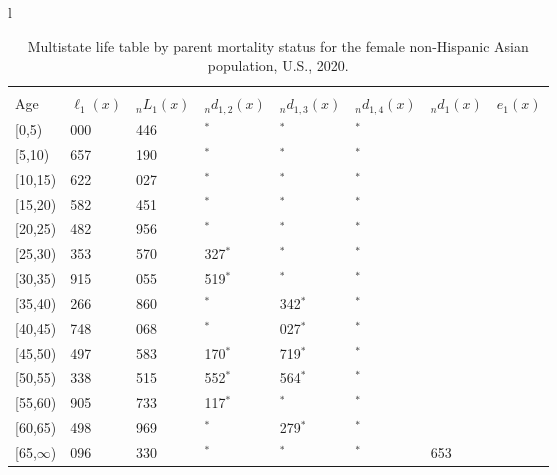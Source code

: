 \documentclass[
]{article}
\begin{document}
\begin{table}
\caption{\label{tab:table-nhasian-female}Multistate life table by parent mortality status for the female non-Hispanic Asian population, U.S., 2020.}

\centering
\fontsize{9}{11}\selectfont
\begin{tabular}[t]{l}
\hline
\begin{tabular}{>{\raggedright\arraybackslash}p{.45in}>{\raggedleft\arraybackslash}p{.65in}>{\raggedleft\arraybackslash}p{.65in}>{\raggedleft\arraybackslash}p{.65in}>{\raggedleft\arraybackslash}p{.65in}>{\raggedleft\arraybackslash}p{.65in}>{\raggedleft\arraybackslash}p{.65in}>{\raggedleft\arraybackslash}p{.65in}}
\toprule
\multicolumn{1}{c}{ } & \multicolumn{7}{c}{(1) Lost neither} \\
\cmidrule(l{3pt}r{3pt}){2-8}
Age & $\ell_{1}(x)$ & ${}_nL_{1}(x)$ & ${}_nd_{1,2}(x)$ & ${}_nd_{1,3}(x)$ & ${}_nd_{1,4}(x)$ & ${}_nd_{1}(x)$ & $e_{1}(x)$\\
\midrule
{}[0,5) & 100 000 & 498 446 & 0$^{*}$ & 0$^{*}$ & 0$^{*}$ & 343 & 47\\
{}[5,10) & 99 657 & 498 190 & 0$^{*}$ & 0$^{*}$ & 0$^{*}$ & 35 & 43\\
{}[10,15) & 99 622 & 498 027 & 0$^{*}$ & 0$^{*}$ & 0$^{*}$ & 39 & 38\\
{}[15,20) & 99 582 & 486 451 & 0$^{*}$ & 0$^{*}$ & 0$^{*}$ & 101 & 33\\
{}[20,25) & 99 482 & 491 956 & 0$^{*}$ & 0$^{*}$ & 0$^{*}$ & 128 & 28\\
\addlinespace
{}[25,30) & 99 353 & 432 570 & 14 327$^{*}$ & 0$^{*}$ & 0$^{*}$ & 112 & 23\\
{}[30,35) & 84 915 & 428 055 & 4 519$^{*}$ & 0$^{*}$ & 0$^{*}$ & 130 & 19\\
{}[35,40) & 80 266 & 422 860 & 0$^{*}$ & 4 342$^{*}$ & 0$^{*}$ & 176 & 14\\
{}[40,45) & 75 748 & 354 068 & 0$^{*}$ & 4 027$^{*}$ & 0$^{*}$ & 223 & 10\\
{}[45,50) & 71 497 & 259 583 & 9 170$^{*}$ & 6 719$^{*}$ & 0$^{*}$ & 270 & 6\\
\addlinespace
{}[50,55) & 55 338 & 188 515 & 7 552$^{*}$ & 10 564$^{*}$ & 0$^{*}$ & 317 & 4\\
{}[55,60) & 36 905 & 118 733 & 23 117$^{*}$ & 0$^{*}$ & 0$^{*}$ & 290 & 2\\
{}[60,65) & 13 498 & 31 969 & 0$^{*}$ & 7 279$^{*}$ & 0$^{*}$ & 123 & 1\\
{}[65,$\infty$) & 6 096 & 38 330 & 0$^{*}$ & 0$^{*}$ & 0$^{*}$ & 1 653 & 0\\

\end{tabular}
\end{tabular}
\end{table}
\end{document}
